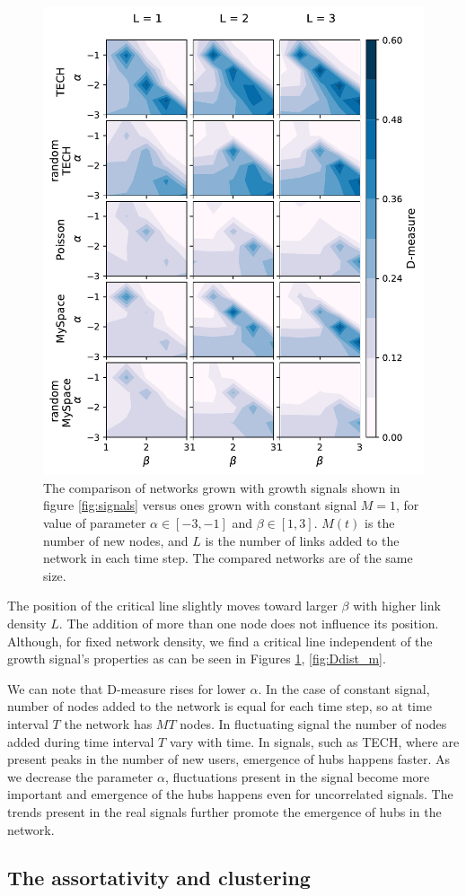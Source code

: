 \begin{figure}[h!]
	\centering
	\includegraphics[width=0.5\linewidth]{Figures/Ddistance.pdf}
	\caption{The comparison of networks grown with growth signals shown in figure \ref{fig:signals} versus ones grown with constant signal $M=1$, for value of parameter $\alpha\in[-3,-1]$ and $\beta\in[1,3]$. $M(t)$ is the number of new nodes, and $L$ is the number of links added to the network in each time step. The compared networks are of the same size.}
	\label{fig:dmeasure}
\end{figure}

The position of the critical line slightly moves toward larger $\beta$ with higher link density $L$. The addition of more than one node does not influence its position. Although, for fixed network density, we find a critical line independent of the growth signal's properties as can be seen in Figures \ref{fig:dmeasure}, \ref{fig:Ddist_m}. 

We can note that D-measure rises for lower $\alpha$. In the case of constant signal, number of nodes added to the network is equal for each time step, so at time interval $T$ the network has $MT$ nodes. In fluctuating signal the number of nodes  added during time interval $T$ vary with time. In signals, such as TECH, where are present peaks in the number of new users, emergence of hubs happens faster. As we decrease the parameter $\alpha$, fluctuations present in the signal become more important and emergence of the hubs happens even for uncorrelated signals. The trends present in the real signals further promote the emergence of hubs in the network.    

\subsection{The assortativity and clustering}

